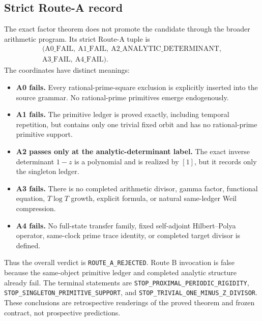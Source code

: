 \subsection{Strict Route-A record}

The exact factor theorem does not promote the candidate through the broader
arithmetic program.  Its strict Route-A tuple is
\[
\begin{gathered}
  (\mathrm{A0\_FAIL},\ \mathrm{A1\_FAIL},\
   \mathrm{A2\_ANALYTIC\_DETERMINANT},\\
   \mathrm{A3\_FAIL},\ \mathrm{A4\_FAIL}).
\end{gathered}
\]
The coordinates have distinct meanings:

\begin{itemize}
\item \textbf{A0 fails.} Every rational-prime-square exclusion is explicitly inserted
  into the source grammar.  No rational-prime primitives emerge endogenously.
\item \textbf{A1 fails.} The primitive ledger is proved exactly, including temporal
  repetition, but contains only one trivial fixed orbit and has no
  rational-prime primitive support.
\item \textbf{A2 passes only at the analytic-determinant label.} The exact inverse
  determinant \(1-z\) is a polynomial and is realized by \([1]\), but it
  records only the singleton ledger.
\item \textbf{A3 fails.} There is no completed arithmetic divisor, gamma factor,
  functional equation, \(T\log T\) growth, explicit formula, or natural
  same-ledger Weil compression.
\item \textbf{A4 fails.} No full-state transfer family, fixed self-adjoint
  Hilbert--Polya operator, same-clock prime trace identity, or completed target
  divisor is defined.
\end{itemize}

Thus the overall verdict is \texttt{ROUTE\_A\_REJECTED}.  Route B invocation
is false because the same-object primitive ledger and completed analytic
structure already fail.  The terminal statements are
\texttt{STOP\_PROXIMAL\_PERIODIC\_RIGIDITY},
\texttt{STOP\_SINGLETON\_PRIMITIVE\_SUPPORT}, and
\texttt{STOP\_TRIVIAL\_ONE\_MINUS\_Z\_DIVISOR}.  These conclusions are
retrospective renderings of the proved theorem and frozen contract, not
prospective predictions.
